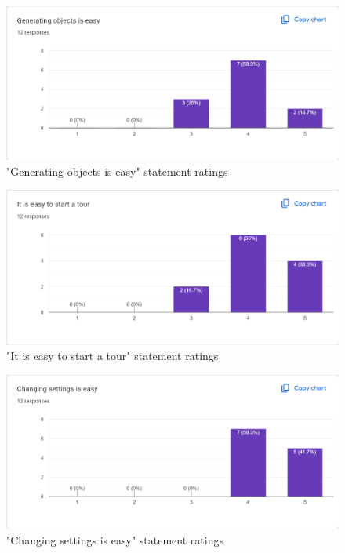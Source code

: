 \documentclass[12pt, titlepage]{article}
\begin{document}
\begin{figure}[htbp]
  \caption{"Generating objects is easy" statement ratings}
  \centerline{\includegraphics[scale=0.35]{./Images/Q3.png}}
  \label{fig:Detached}
\end{figure}

\begin{figure}[htbp]
  \caption{"It is easy to start a tour" statement ratings}
  \centerline{\includegraphics[scale=0.35]{./Images/Q4.png}}
  \label{fig:RealWorld}
\end{figure}

\begin{figure}[htbp]
  \caption{"Changing settings is easy" statement ratings}
  \centerline{\includegraphics[scale=0.35]{./Images/Q5.png}}
  \label{fig:Fun}
\end{figure}
\end{document}
